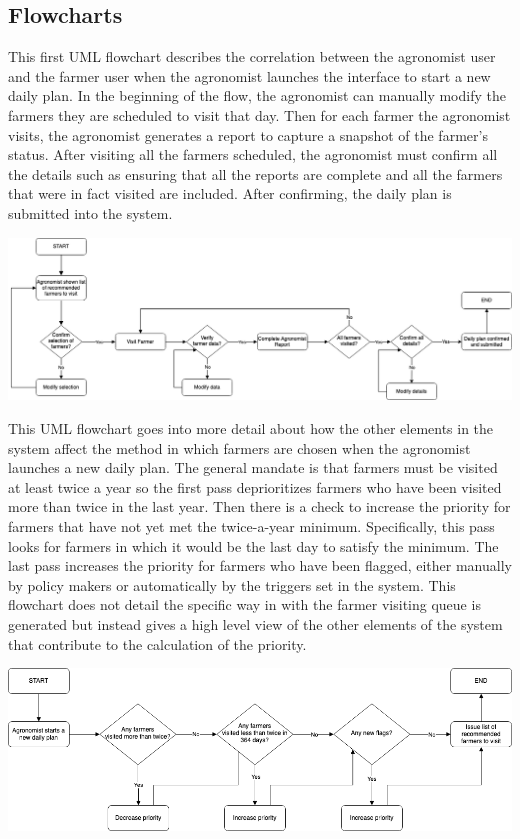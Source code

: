 \subsection{Flowcharts}
\begin{flushleft}
This first UML flowchart describes the correlation between the agronomist user and the farmer user when the agronomist launches the interface to start a new daily plan. In the beginning of the flow, the agronomist can manually modify the farmers they are scheduled to visit that day. Then for each farmer the agronomist visits, the agronomist generates a report to capture a snapshot of the farmer's status. After visiting all the farmers scheduled, the agronomist must confirm all the details such as ensuring that all the reports are complete and all the farmers that were in fact visited are included. After confirming, the daily plan is submitted into the system.
\end{flushleft}
\begin{center}
\includegraphics[scale=0.4]{../images_diagrams/agronomistexecutesplan.png}
\end{center}

\begin{flushleft}
This UML flowchart goes into more detail about how the other elements in the system affect the method in which farmers are chosen when the agronomist launches a new daily plan. The general mandate is that farmers must be visited at least twice a year so the first pass deprioritizes farmers who have been visited more than twice in the last year. Then there is a check to increase the priority for farmers that have not yet met the twice-a-year minimum. Specifically, this pass looks for farmers in which it would be the last day to satisfy the minimum. The last pass increases the priority for farmers who have been flagged, either manually by policy makers or automatically by the triggers set in the system. This flowchart does not detail the specific way in with the farmer visiting queue is generated but instead gives a high level view of the other elements of the system that contribute to the calculation of the priority. 
\end{flushleft}
\begin{center}
\includegraphics[scale=0.4]{../images_diagrams/adjustvisitpriority.png}
\end{center}

